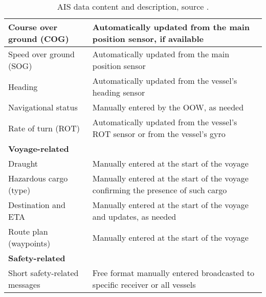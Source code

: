 \documentclass[../main.tex]{subfiles}
\begin{document}
\begin{table}[H]
\begin{tabular}{|m{5cm}|m{9cm}|}
Course over ground (COG)                                     & Automatically updated from the main position sensor, if available                  \\ \hline
Speed over ground (SOG)                                      & Automatically updated from the main position sensor                               \\ \hline
Heading                                                      & Automatically updated from the vessel's heading sensor                             \\ \hline
Navigational status                                          & Manually entered by the OOW, as needed                                             \\ \hline
Rate of turn (ROT)                                           & Automatically updated from the vessel's ROT sensor or from the vessel's gyro        \\ \hline
\rowcolor[HTML]{C0C0C0} 
\textbf{Voyage-related}                                      &                                                                                   \\ \hline
Draught                                                      & Manually entered at the start of the voyage                                       \\ \hline
Hazardous cargo (type)                                       & Manually entered at the start of the voyage confirming the presence of such cargo \\ \hline
Destination and ETA                                          & Manually entered at the start of the voyage and updates, as needed                 \\ \hline
Route plan (waypoints)                                       & Manually entered at the start of the voyage                                       \\ \hline
\rowcolor[HTML]{C0C0C0} 
\textbf{Safety-related}                                      &                                                                                   \\ \hline
Short safety-related messages                                & Free format manually entered broadcasted to specific receiver or all vessels      \\ \hline
\end{tabular}
\caption{AIS data content and description, source \cite{IMO_2015}.}
\label{tab:ais-data}
\end{table}
\end{document}
